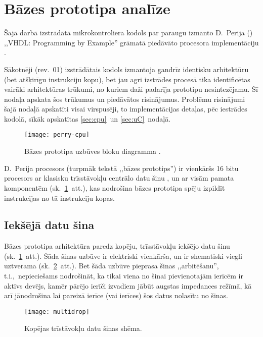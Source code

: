 \section{Bāzes prototipa analīze}
Šajā darbā izstrādātā mikrokontroliera kodols par paraugu izmanto
D.~Perija () ,,VHDL: Programming by Example'' grāmatā
piedāvāto procesora imple\-men\-tā\-ciju \cite{Perry-VHDL}.

Sākotnēji (rev.~01) izstrādātais kodols izmantoja gandrīz identisku
arhitektūru (bet atšķirīgu instrukciju kopu), bet
jau agri izstrādes procesā tika identificētas vairāki arhitektūras trūkumi,
no kuriem daži padarīja prototipu nesintezējamu.
Šī nodaļa apskata šos trūkumus un piedāvātos risinājumus.
Problēmu risinājumi šajā nodaļā apskatīti visai virspusēji,
to implementācijas detaļas, pēc iestrādes kodolā,
sīkāk apskatītas \ref{sec:cpu}~un \ref{sec:uC}~nodaļā.

\begin{figure}[thb]
	\centering
	\texttt{[image: perry-cpu]}
	\caption[Bāzes prototipa uzbūves bloku diagramma.]
	        {Bāzes prototipa uzbūves bloku diagramma \cite[290.~lpp.]{Perry-VHDL}.}
	\label{fig:perry-cpu}
\end{figure}

D.~Perija procesors (turpmāk tekstā ,,bāzes prototips'')
ir vienkāršs 16 bitu procesors ar klasisku trīsstāvokļu 
centrālo datu šinu \cite{Flynn-arch}\cite{Heath}, un ar visām pamata
komponentēm (sk.~\ref{fig:perry-cpu}~att.), kas nodrošina bāzes prototipa
spēju izpildīt instrukcijas no tā instrukciju kopas.

\subsection{Iekšējā datu šina}
	Bāzes prototipa arhitektūra paredz kopēju, trīsstāvokļu iekšējo datu šinu
	(sk.~\ref{fig:perry-cpu}~att.).
	Šāda šinas uzbūve ir elektriski vienkārša, un ir shematiski viegli uztverama
	(sk.~\ref{fig:multidrop}~att.). Bet šāda uzbūve pieprasa šinas 
	,,arbitēšanu'', t.i.,~nepieciešams
	nodrošināt, ka tikai viena no šinai pievienotajām ierīcēm ir aktīvs devējs,
	kamēr pārējo ierīči izvadiem jābūt augstas impedances režīmā, kā arī
	jānodrošina lai pareizā ierīce (vai ierīces) šos datus nolasītu no šinas.

	\begin{figure}[thb]
		\centering
		\texttt{[image: multidrop]}
		\caption{Kopējas trīstāvokļu datu šinas shēma.}
		\label{fig:multidrop}
	\end{figure}

